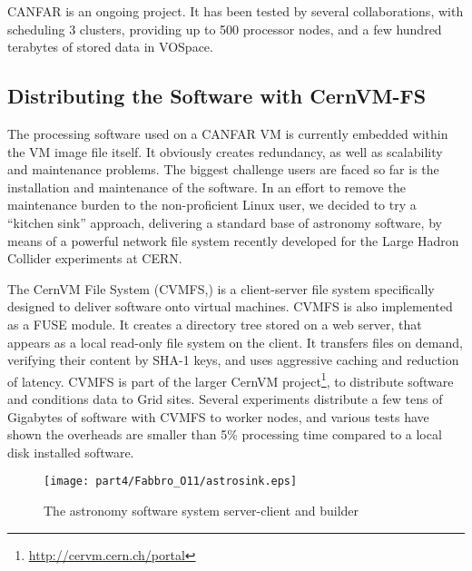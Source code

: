 CANFAR is an ongoing project. It has been tested by several
collaborations, with scheduling 3 clusters, providing up to 500
processor nodes, and a few hundred terabytes of stored data in
VOSpace.

\subsection{Distributing the Software with CernVM-FS}
The processing software used on a CANFAR VM is currently embedded within the VM image
file itself. It obviously creates redundancy, as
well as scalability and maintenance problems. The
biggest challenge users are faced so far is the installation and
maintenance of the software. In an effort to remove the maintenance burden
to the non-proficient Linux user, we decided to try a ``kitchen sink''
approach, delivering a standard base of astronomy software, by means
of a powerful network file system recently developed for the Large
Hadron Collider experiments at CERN.

The CernVM File System (CVMFS,\cite{blomer11}) is a client-server file system
specifically designed to deliver software onto virtual machines. CVMFS
is also implemented as a FUSE module. It creates a directory
tree stored on a web server, that appears as a local read-only file
system on the client. It transfers files on demand, verifying their
content by SHA-1 keys, and uses aggressive caching and reduction of latency. CVMFS is
part of the larger CernVM project\footnote{\url{http://cervm.cern.ch/portal}}, to distribute software and
conditions data to Grid sites. Several experiments distribute a few tens of Gigabytes of software with CVMFS to worker
nodes, and various tests have shown the overheads are smaller than 5\%
processing time compared to a local disk installed software.

\begin{center}
  \begin{figure}
    \texttt{[image: part4/Fabbro\_O11/astrosink.eps]}
    \caption{The astronomy software system server-client and builder}
  \end{figure}  
\end{center}

